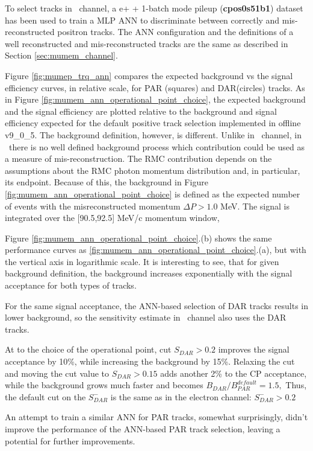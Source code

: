 To select tracks in \MuToEp\ channel, a e+ + 1-batch mode pileup ({\bf cpos0s51b1}) dataset 
has been used to train a MLP ANN to discriminate between correctly and mis-reconstructed positron tracks.
The ANN configuration and the definitions of a well reconstructed and mis-reconstructed tracks are
the same as described in Section \ref{sec:mumem_channel}.

Figure \ref{fig:mumep_trq_ann} compares the expected background vs the signal efficiency curves,
in relative scale, for PAR (squares) and DAR(circles) tracks.
As in Figure \ref{fig:mumem_ann_operational_point_choice}, the expected background and the signal
efficiency are plotted relative to the background and signal efficiency expected for the default
positive track selection implemented in offline v9\_0\_5.
The background definition, however, is different. Unlike in \MuToEm\ channel, in \MuToEp\ there is
no well defined background process which contribution could be used as a measure of mis-reconstruction.
The RMC contribution depends on the assumptions about the RMC photon momentum distribution and,
in particular, its endpoint. Because of this, the background in Figure \ref{fig:mumem_ann_operational_point_choice}
is defined as the expected number of events with the misreconstructed momentum $\Delta{P} > 1.0$ MeV.
The signal is integrated over the [90.5,92.5] MeV/c momentum window,

Figure \ref{fig:mumem_ann_operational_point_choice}.(b) shows the same performance curves
as \ref{fig:mumem_ann_operational_point_choice}.(a), but with the vertical axis in logarithmic scale.
It is interesting to see, that for given background definition, the background increases exponentially
with the signal acceptance for both types of tracks.

For the same signal acceptance, the ANN-based selection of DAR tracks results in lower
background, so the sensitivity estimate in \MuToEp\ channel also uses the DAR tracks. 

At to the choice of the operational point, cut $S_{DAR} > 0.2$ improves the signal acceptance
by 10\%, while increasing the background by 15\%. Relaxing the cut and moving the cut value
to $S_{DAR} > 0.15$ adds another 2\% to the CP acceptance, while the background grows much faster
and becomes $B_{DAR}/B_{PAR}^{default} = 1.5,$
Thus, the default cut on the $S_{DAR}^-$ is the same as in the electron channel:  $S_{DAR}^- > 0.2$

An attempt to train a similar ANN for PAR tracks, somewhat surprisingly, didn't improve the performance
of the ANN-based PAR track selection, leaving a potential for further improvements.

